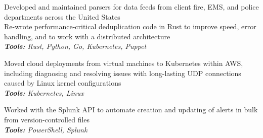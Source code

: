 \documentclass[10pt,letter]{altacv}
\begin{document}

\begin{fullwidth}
\marginpar{\makesidebarheader}
    \vspace*{-1\baselineskip}
\makecvheader
\end{fullwidth}


Developed and maintained parsers for data feeds from client fire, EMS, and police departments across the United States \\
Re-wrote performance-critical deduplication code in Rust to improve speed, error handling, and to work with a distributed architecture \\
\textit{\textbf{Tools:} Rust, Python, Go, Kubernetes, Puppet}

\divider

Moved cloud deployments from virtual machines to Kubernetes within AWS, including diagnosing and resolving issues with long-lasting UDP connections caused by Linux kernel configurations \\
\textit{\textbf{Tools:} Kubernetes, Linux}

\divider

Worked with the Splunk API to automate creation and updating of alerts in bulk from version-controlled files \\
\textit{\textbf{Tools:} PowerShell, Splunk}
\end{document}
